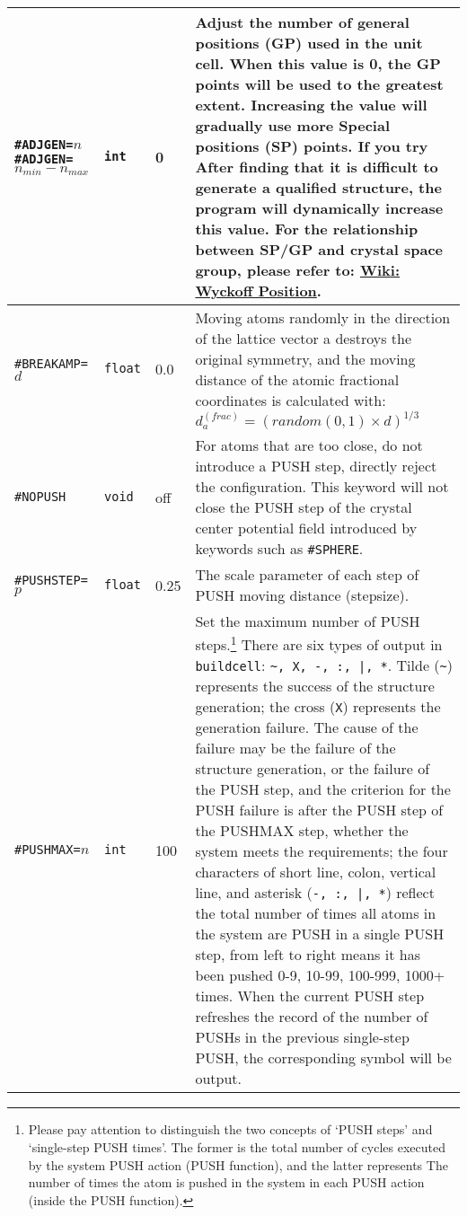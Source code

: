 \documentclass[a4paper, 10pt]{article}
\begin{document}
\begin{center}
\begin{longtable}{m{11em}|m{4em}<{\centering}|m{3em}<{\centering}|m{15em}}
\midrule
\verb|#ADJGEN=|\(n\)\hspace{4em}\verb|#ADJGEN=|\(n_{min}-n_{max}\)  & \verb|int|  & 0 & Adjust the number of general positions (GP) used in the unit cell. When this value is 0, the GP points will be used to the greatest extent. Increasing the value will gradually use more Special positions (SP) points. If you try After finding that it is difficult to generate a qualified structure, the program will dynamically increase this value. For the relationship between SP/GP and crystal space group, please refer to: \href{https://en.wikipedia.org/wiki/Wyckoff_positions}{Wiki: Wyckoff Position}.\\
\midrule
\verb|#BREAKAMP=|\(d\) & \verb|float| & 0.0 & Moving atoms randomly in the direction of the lattice vector a destroys the original symmetry, and the moving distance of the atomic fractional coordinates is calculated with: \(d^{(frac)}_a=(random(0,1)\times{}d)^{1/3}\)\\
\midrule
\verb|#NOPUSH|& \verb|void| & off & For atoms that are too close, do not introduce a PUSH step, directly reject the configuration. This keyword will not close the PUSH step of the crystal center potential field introduced by keywords such as \verb|#SPHERE|.\\
\midrule
\verb|#PUSHSTEP=|\(p\)& \verb|float| & 0.25 & The scale parameter of each step of PUSH moving distance (stepsize).\\
\midrule
\verb|#PUSHMAX=|\(n\)& \verb|int| & 100 & Set the maximum number of PUSH steps.\footnote{Please pay attention to distinguish the two concepts of `PUSH steps' and `single-step PUSH times'. The former is the total number of cycles executed by the system PUSH action (PUSH function), and the latter represents The number of times the atom is pushed in the system in each PUSH action (inside the PUSH function).} There are six types of output in \verb|buildcell|: \verb!~, X, -, :, |, *!. Tilde (\verb|~|) represents the success of the structure generation; the cross (\verb|X|) represents the generation failure. The cause of the failure may be the failure of the structure generation, or the failure of the PUSH step, and the criterion for the PUSH failure is after the PUSH step of the PUSHMAX step, whether the system meets the requirements; the four characters of short line, colon, vertical line, and asterisk (\verb!-, :, |, *!) reflect the total number of times all atoms in the system are PUSH in a single PUSH step, from left to right means it has been pushed 0-9, 10-99, 100-999, 1000+ times. When the current PUSH step refreshes the record of the number of PUSHs in the previous single-step PUSH, the corresponding symbol will be output.\\

\end{longtable}
\end{center}
\end{document}
